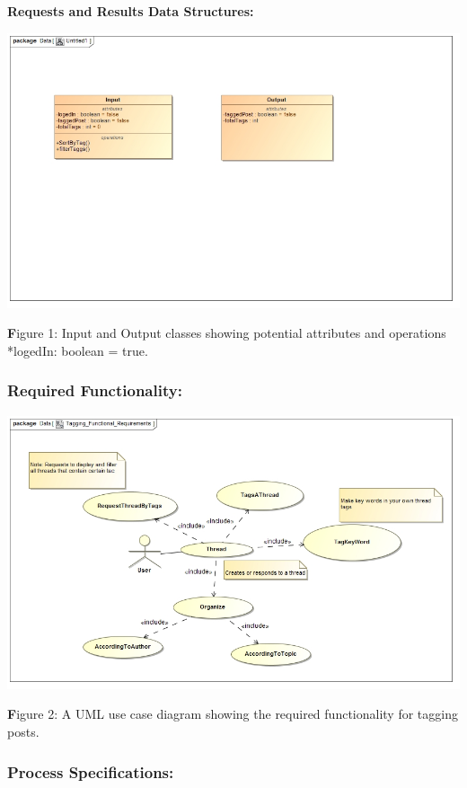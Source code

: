\documentclass[a4paper,11pt]{article}
\begin{document}
\textbf{Requests and Results Data Structures:}

\begin{center}
\includegraphics[width=0.9\linewidth]{Images/SocialTagging/Tag_Input_Output_ClassDiagram}
\end{center}

\textbf Figure 1: Input and Output classes showing potential attributes and operations *logedIn: boolean = true.

\subsubsection{Required Functionality:} 
\begin{center}
\includegraphics[width=0.9\linewidth]{Images/SocialTagging/Tagging_Functional_Requirements}
\end{center}

\textbf Figure 2: A UML use case diagram showing the required functionality for tagging posts.

\subsubsection{Process Specifications:} 
\end{document}
